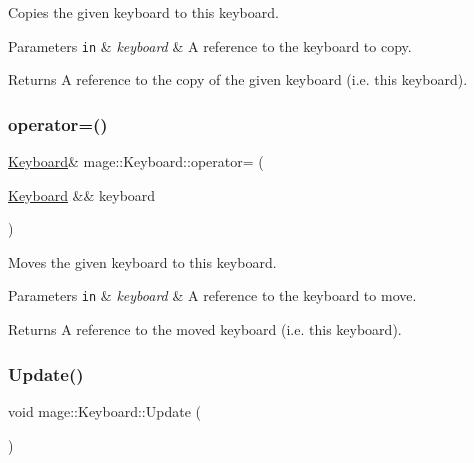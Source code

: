 Copies the given keyboard to this keyboard.


\begin{DoxyParams}[1]{Parameters}
\mbox{\tt in}  & {\em keyboard} & A reference to the keyboard to copy. \\
\hline
\end{DoxyParams}
\begin{DoxyReturn}{Returns}
A reference to the copy of the given keyboard (i.\+e. this keyboard). 
\end{DoxyReturn}
\hypertarget{classmage_1_1_keyboard_a4f381bc90cc6828b4d0313999b544e6e}{}\label{classmage_1_1_keyboard_a4f381bc90cc6828b4d0313999b544e6e} 
\subsubsection{\texorpdfstring{operator=()}{operator=()}\hspace{0.1cm}{\footnotesize\ttfamily [2/2]}}
{\footnotesize\ttfamily \hyperlink{classmage_1_1_keyboard}{Keyboard}\& mage\+::\+Keyboard\+::operator= (\begin{DoxyParamCaption}\item[{\hyperlink{classmage_1_1_keyboard}{Keyboard} \&\&}]{keyboard }\end{DoxyParamCaption})\hspace{0.3cm}{\ttfamily [delete]}}

Moves the given keyboard to this keyboard.


\begin{DoxyParams}[1]{Parameters}
\mbox{\tt in}  & {\em keyboard} & A reference to the keyboard to move. \\
\hline
\end{DoxyParams}
\begin{DoxyReturn}{Returns}
A reference to the moved keyboard (i.\+e. this keyboard). 
\end{DoxyReturn}
\hypertarget{classmage_1_1_keyboard_abb5fd91a304f8bbf8b15ab1a277dafaf}{}\label{classmage_1_1_keyboard_abb5fd91a304f8bbf8b15ab1a277dafaf} 
\subsubsection{\texorpdfstring{Update()}{Update()}}
{\footnotesize\ttfamily void mage\+::\+Keyboard\+::\+Update (\begin{DoxyParamCaption}{ }\end{DoxyParamCaption})}

